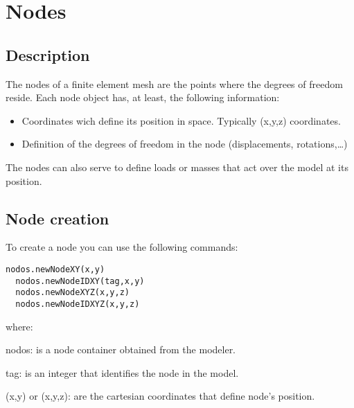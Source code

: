 \section{Nodes}

\subsection{Description}
The nodes of a finite element mesh are the points where the degrees of freedom reside. Each node object has, at least, the following information:

\begin{itemize}
\item Coordinates wich define its position in space. Typically (x,y,z) coordinates.
\item Definition of the degrees of freedom in the node (displacements, rotations,\ldots)
\end{itemize}

The nodes can also serve to define loads or masses that act over the model at its position.

\subsection{Node creation}

To create a node you can use the following commands:

\begin{lstlisting}[frame=single]
  nodos.newNodeXY(x,y)
  nodos.newNodeIDXY(tag,x,y)
  nodos.newNodeXYZ(x,y,z)
  nodos.newNodeIDXYZ(x,y,z)
\end{lstlisting}

\noindent where:

\begin{description}
\item{nodos:} is a node container obtained from the modeler.
\item{tag:} is an integer that identifies the node in the model.
\item{(x,y) or (x,y,z):} are the cartesian coordinates that define node's position.
\end{description}

